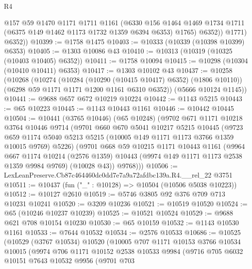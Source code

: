 \begin{lexlean}{R4}
\begin{coremodule}
              @157
              @59
              @1470
              @1171
              @1711
              @1161
              (@6330
                @156
                @1464
                @1469
                @1734
                @1711
                (@6375 @149 @1462 @1173 @1732 @1359 @6394 @6353)
                @1765)
              @6352))
          @1771)
        @6352))
@10399 := @1758 @1475
@10403 := @10333 (@10339 (@10398 @10399) @6353)
@10405 := @1303 @10086 @43
@10410 := @10313 (@10319 (@10325 (@10403 @10405) @6352))
@10411 := @1758 @10094
@10415 := @10298 (@10304 (@10410 @10411) @6353)
@10417 := @1303 @10102 @43
@10437 := @10258
    (@10268
      (@10274
        (@10284 (@10290 (@10415 @10417) @6352) (@1806 @10110))
        (@6298 @59 @1171 @1171 @1200 @1161 @6310 @6352))
      (@5666 @10124 @1145))
@10441 := @9688 @657 @672 @10219 @10224
@10442 := @1143 @5215
@10443 := @65 @10223
@10445 := @1143 @10443 @1161
@10446 := @10442 @10445
@10504 := @10441
    (@3765 @10446)
    (@65 @10248)
    (@9702
      @671
      @1171
      @10218
      @3764
      @10446
      @9714
      (@9701
        @660
        @670
        @5041
        @10217
        @5215
        @10445
        (@9723
          @659
          @1174
          @5040
          @5213
          @5215
          (@10005 @149 @1171 @1173 @3766 @1359 @10015 @9769)
          @5226)
        (@9701
          @668
          @59
          @10215
          @1171
          @10443
          @1161
          (@9964
            @667
            @1174
            @10214
            (@2576 @1359)
            @10443
            (@9974 @149 @1171 @1173 @2538 @1359 @9984 @9769)
            (@10028 @43))
          @9768)))
@10506 := LexLeanPreserve.Cb87c464460dc0dd7e7a9a72afdbc139a.R4.__rel_22 @3751
@10511 := @10437 (fun ("_" : @10128) => @10504 (@10506 @5038 @10223))
@10512 := @10127 @2610
@10519 := @5746 @3805 @92 @376 @709 @713 @10231 @10241
@10520 := @3209 @10236
@10521 := @10519 @10520
@10524 := @65 (@10246 @10237 @10239)
@10525 := @10521 @10524
@10529 := @9688 @621 @708 @10154 @10230
@10530 := @65 @10159
@10532 := @1143 @10530 @1161
@10533 := @7644 @10532
@10534 := @2576 @10533
@10686 := @10525
    (@10529
      (@3767 @10534)
      @10520
      (@10005
        @707
        @1171
        @10153
        @3766
        @10534
        @10015
        (@9974
          @706
          @1171
          @10152
          @2538
          @10533
          @9984
          (@9716
            @705
            @6032
            @10151
            @7643
            @10532
            @9956
            (@9701
              @703

\end{coremodule}
\end{lexlean}
